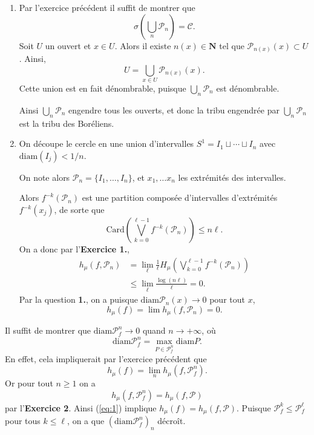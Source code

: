 \documentclass[a4paper,12pt,openany]{article}
\theoremstyle{plain}
\theoremstyle{definition}
\newcommand{\N}{\mathbf{N}}
\newcommand{\Pcal}{\mathcal{P}}
\newcommand{\Bcal}{\mathcal{C}}
\newcommand{\diam}{\mathrm{diam}}
\begin{document}
\begin{enumerate}
\item Par l'exercice pr\'ec\'edent il suffit de montrer que
$$
\sigma\left(\bigcup_n \Pcal_n \right) = \Bcal.
$$
 Soit $U$ un ouvert et $x\in U$. Alors il existe $n(x) \in \N$ tel que $\Pcal_{n(x)}(x) \subset U$.  Ainsi,
$$
U = \bigcup_{x \in U} \Pcal_{n(x)}(x).
$$
 Cette union est en fait d\'enombrable, puisque $\bigcup_n \Pcal_n$ est d\'enombrable.  

Ainsi $\bigcup_n \Pcal_n$ engendre tous les ouverts, et donc la tribu engendr\'ee par $\bigcup_n \Pcal_n$ est la tribu des Bor\'eliens.  
\item On d\'ecoupe le cercle en une union d'intervalles $S^1 = I_1 \sqcup \cdots \sqcup I_n$ avec $\mathrm{diam}(I_j) < 1/n$.  

On note alors $\Pcal_n = \{I_1, \dots, I_n\}$, et $x_1, \dots x_n$ les extr\'emit\'es des intervalles.




Alors $f^{-k}(\Pcal_n)$ est une partition compos\'ee d'intervalles d'extr\'emit\'es $f^{-k}(x_j)$, de sorte que 
$$
\mathrm{Card}\left(\bigvee_{k=0}^{\ell-1}f^{-k}(\Pcal_n)\right) \leqslant n\ell.
$$
 On a donc par l'\textbf{Exercice 1.},
$$
\begin{aligned}
h_\mu(f, \Pcal_n) &= \lim_\ell \frac{1}{\ell} H_\mu \left(\bigvee_{k=0}^{\ell-1}f^{-k}(\Pcal_n)\right)  \\
&\leqslant \lim_\ell \frac{\log (n\ell)}{\ell} = 0.
\end{aligned}
$$
 Par la question \textbf{1.}, on a puisque $\mathrm{diam}\Pcal_n(x) \to 0$ pour tout $x$, 
$$
h_\mu(f) = \lim h_\mu(f,\Pcal_n) = 0.
$$


\end{enumerate}

\vspace{0.6cm}


 \vspace{1.5mm} 

\noindent
Il suffit de montrer que $\diam \Pcal^n_f \to 0$ quand $n \to +\infty$, o\`u
\begin{equation}\label{eq:1}
\diam \Pcal^n_f = \max_{P \in \Pcal^n_f} \diam P.
\end{equation}
 En effet, cela impliquerait par l'exercice pr\'ec\'edent que
$$
h_\mu(f) = \lim_n h_\mu(f, \Pcal^n_f).
$$
Or pour tout $n \geqslant 1$ on a 
$$
h_\mu(f, \Pcal^n_f) = h_\mu(f, \Pcal)
$$
par l'\textbf{Exercice 2}. Ainsi (\ref{eq:1}) implique $h_\mu(f) = h_\mu(f, \Pcal)$. Puisque $\Pcal^k_f \leqslant \Pcal^\ell_f$ pour tous $k \leqslant \ell$, on a que $(\diam \Pcal^n_f)_n$ d\'ecro\^it. 
\end{document}
